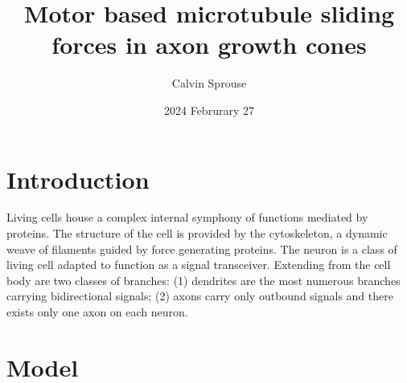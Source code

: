 \documentclass[a4paper, 12pt]{article}
\title{Motor based microtubule sliding forces in axon growth cones}
\author{Calvin Sprouse}
\affil{PHYS 322, Winter 2024}
\date{2024 Februrary 27}
\begin{document}
\maketitle

\section*{Introduction}
Living cells house a complex internal symphony of functions mediated by proteins. The structure of the cell is provided by the cytoskeleton, a dynamic weave of filaments guided by force generating proteins. The neuron is a class of living cell adapted to function as a signal transceiver. Extending from the cell body are two classes of branches: (1) dendrites are the most numerous branches carrying bidirectional signals; (2) axons carry only outbound signals and there exists only one axon on each neuron. 


\section*{Model}




\end{document}
